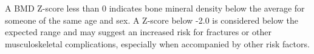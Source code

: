 A BMD Z-score less than 0 indicates bone mineral density below the average for
someone of the same age and sex. A Z-score below -2.0 is considered below the
expected range and may suggest an increased risk for fractures or other
musculoskeletal complications, especially when accompanied by other risk
factors.

